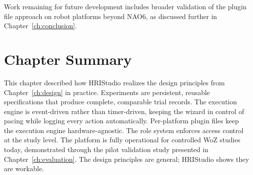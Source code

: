 Work remaining for future development includes broader validation of the plugin file approach on robot platforms beyond NAO6, as discussed further in Chapter~\ref{ch:conclusion}.

\section{Chapter Summary}

This chapter described how HRIStudio realizes the design principles from Chapter~\ref{ch:design} in practice. Experiments are persistent, reusable specifications that produce complete, comparable trial records. The execution engine is event-driven rather than timer-driven, keeping the wizard in control of pacing while logging every action automatically. Per-platform plugin files keep the execution engine hardware-agnostic. The role system enforces access control at the study level. The platform is fully operational for controlled WoZ studies today, demonstrated through the pilot validation study presented in Chapter~\ref{ch:evaluation}. The design principles are general; HRIStudio shows they are workable.
